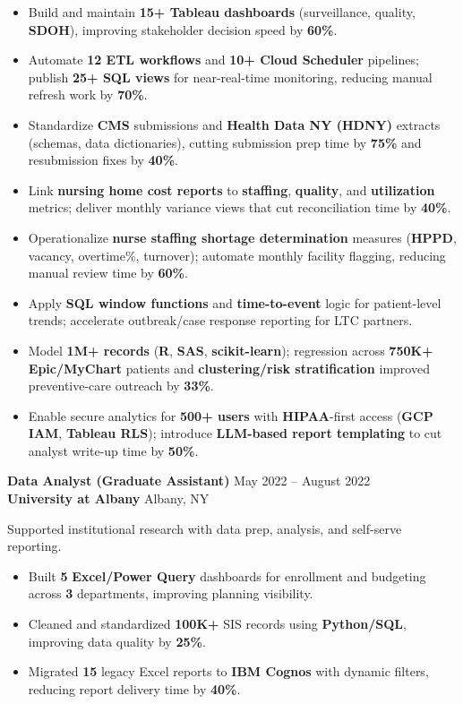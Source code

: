 \documentclass[9.5pt]{article}
\begin{document}
\begin{itemize}\setlength\itemsep{0.25em}
  \item Build and maintain \textbf{15+ Tableau dashboards} (surveillance, quality, \textbf{SDOH}), improving stakeholder decision speed by \textbf{60\%}.
  \item Automate \textbf{12 ETL workflows} and \textbf{10+ Cloud Scheduler} pipelines; publish \textbf{25+ SQL views} for near-real-time monitoring, reducing manual refresh work by \textbf{70\%}.
  \item Standardize \textbf{CMS} submissions and \textbf{Health Data NY (HDNY)} extracts (schemas, data dictionaries), cutting submission prep time by \textbf{75\%} and resubmission fixes by \textbf{40\%}.
  \item Link \textbf{nursing home cost reports} to \textbf{staffing}, \textbf{quality}, and \textbf{utilization} metrics; deliver monthly variance views that cut reconciliation time by \textbf{40\%}.
  \item Operationalize \textbf{nurse staffing shortage determination} measures (\textbf{HPPD}, vacancy, overtime\%, turnover); automate monthly facility flagging, reducing manual review time by \textbf{60\%}.
  \item Apply \textbf{SQL window functions} and \textbf{time-to-event} logic for patient-level trends; accelerate outbreak/case response reporting for LTC partners.
  \item Model \textbf{1M+ records} (\textbf{R}, \textbf{SAS}, \textbf{scikit-learn}); regression across \textbf{750K+ Epic/MyChart} patients and \textbf{clustering/risk stratification} improved preventive-care outreach by \textbf{33\%}.
  \item Enable secure analytics for \textbf{500+ users} with \textbf{HIPAA}-first access (\textbf{GCP IAM}, \textbf{Tableau RLS}); introduce \textbf{LLM-based report templating} to cut analyst write-up time by \textbf{50\%}.
\end{itemize}

\textbf{Data Analyst (Graduate Assistant)} \hfill May 2022 -- August 2022\\
\textbf{University at Albany} \hfill Albany, NY

Supported institutional research with data prep, analysis, and self-serve reporting.

\begin{itemize}\setlength\itemsep{0.25em}
  \item Built \textbf{5} \textbf{Excel/Power Query} dashboards for enrollment and budgeting across \textbf{3} departments, improving planning visibility.
  \item Cleaned and standardized \textbf{100K+} SIS records using \textbf{Python/SQL}, improving data quality by \textbf{25\%}.
  \item Migrated \textbf{15} legacy Excel reports to \textbf{IBM Cognos} with dynamic filters, reducing report delivery time by \textbf{40\%}.
\end{itemize}
\end{document}
